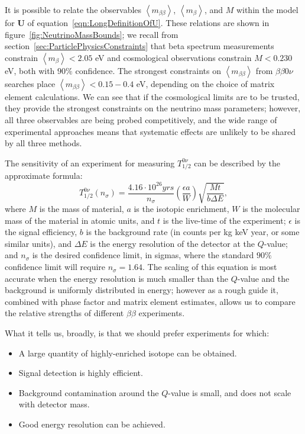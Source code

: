 It is possible to relate the observables $\left< m_{\beta\beta} \right>$, $\left< m_\beta \right>$, and $M$ within the model for $\mathbf{U}$ of equation~\ref{eqn:LongDefinitionOfU}.  These relations are shown in figure~\ref{fig:NeutrinoMassBounds}; we recall from section~\ref{sec:ParticlePhysicsConstraints} that beta spectrum measurements constrain $\left<m_\beta\right> < 2.05$ eV and cosmological observations constrain $M < 0.230$ eV, both with $90\%$ confidence.  The strongest constraints on $\left<m_{\beta\beta}\right>$ from $\beta\beta 0\nu$ searches place $\left<m_{\beta\beta}\right> < 0.15-0.4$ eV, depending on the choice of matrix element calculations.  We can see that if the cosmological limits are to be trusted, they provide the strongest constraints on the neutrino mass parameters; however, all three observables are being probed competitively, and the wide range of experimental approaches means that systematic effects are unlikely to be shared by all three methods.

The sensitivity of an experiment for measuring $T_{1/2}^{0\nu}$ can be described by the approximate formula:~\cite{RMPbb0n}
\begin{equation}
T_{1/2}^{0\nu}(n_\sigma) = \frac{4.16 \cdot 10^{26} yrs}{n_\sigma} \left( \frac{\epsilon a}{W}\right) \sqrt{\frac{Mt}{b \Delta E}},
\end{equation}
where $M$ is the mass of material, $a$ is the isotopic enrichment, $W$ is the molecular mass of the material in atomic units, and $t$ is the live-time of the experiment; $\epsilon$ is the signal efficiency, $b$ is the background rate (in counts per kg keV year, or some similar units), and $\Delta E$ is the energy resolution of the detector at the $Q$-value; and $n_\sigma$ is the desired confidence limit, in sigmas, where the standard $90\%$ confidence limit will require $n_\sigma = 1.64$.  The scaling of this equation is most accurate when the energy resolution is much smaller than the $Q$-value and the background is uniformly distributed in energy; however as a rough guide it, combined with phase factor and matrix element estimates, allows us to compare the relative strengths of different $\beta\beta$ experiments.

What it tells us, broadly, is that we should prefer experiments for which:
\begin{itemize}
\item A large quantity of highly-enriched isotope can be obtained.
\item Signal detection is highly efficient.
\item Background contamination around the $Q$-value is small, and does not scale with detector mass.
\item Good energy resolution can be achieved.
\end{itemize}

